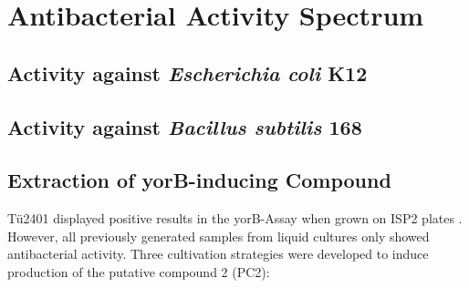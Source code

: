    


\section{Antibacterial Activity Spectrum} %
\label{sec:antibacterial_activity_spectrum}


    \subsection{Activity against \textit{Escherichia coli} K12} %
    \label{sub:activity_against_e_coli}


    \subsection{Activity against \textit{Bacillus subtilis} 168} %
    \label{sub:activity_against_b_subtilis}


    \subsection{Extraction of yorB-inducing Compound} %
    \label{sub:extraction_of_yorb_inducing_compound}

    Tü2401 displayed positive results in the yorB-Assay  when grown on ISP2 plates .
    However, all previously generated samples from liquid cultures only showed antibacterial activity.
    Three cultivation strategies were developed to induce production of the putative compound 2 (PC2):

